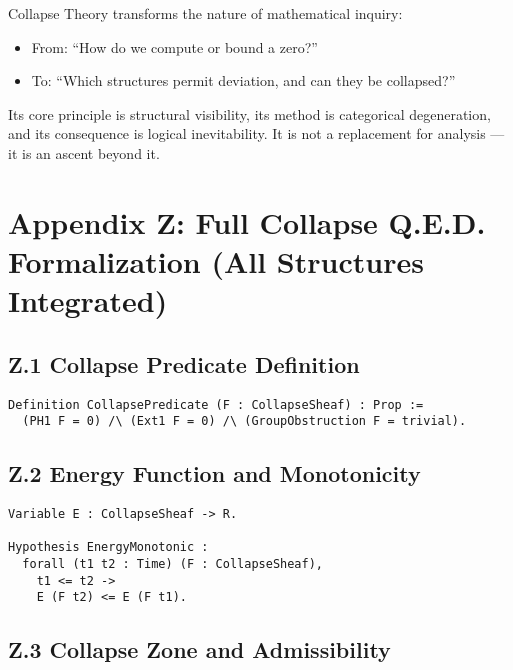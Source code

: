 \documentclass[11pt]{article}
\begin{document}
Collapse Theory transforms the nature of mathematical inquiry:

\begin{itemize}
  \item From: “How do we compute or bound a zero?”
  \item To: “Which structures permit deviation, and can they be collapsed?”
\end{itemize}

Its core principle is structural visibility, its method is categorical degeneration, and its consequence is logical inevitability. It is not a replacement for analysis — it is an ascent beyond it.



\appendix
\section*{Appendix Z: Full Collapse Q.E.D. Formalization (All Structures Integrated)}

\subsection*{Z.1 Collapse Predicate Definition}

\begin{lstlisting}[language=Coq, caption=Collapse Predicate, captionpos=b]
Definition CollapsePredicate (F : CollapseSheaf) : Prop :=
  (PH1 F = 0) /\ (Ext1 F = 0) /\ (GroupObstruction F = trivial).
\end{lstlisting}

\subsection*{Z.2 Energy Function and Monotonicity}

\begin{lstlisting}[language=Coq, caption=Collapse Energy Functional, captionpos=b]
Variable E : CollapseSheaf -> R.

Hypothesis EnergyMonotonic :
  forall (t1 t2 : Time) (F : CollapseSheaf),
    t1 <= t2 ->
    E (F t2) <= E (F t1).
\end{lstlisting}

\subsection*{Z.3 Collapse Zone and Admissibility}
\end{document}

